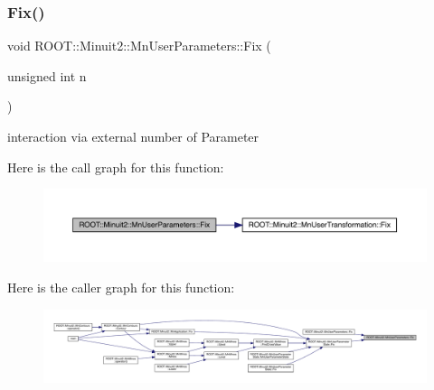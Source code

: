 \mbox{\label{classROOT_1_1Minuit2_1_1MnUserParameters_a53ce277313d9e1f8503e7ffbf8e7bce4}} 
\subsubsection{\texorpdfstring{Fix()}{Fix()}\hspace{0.1cm}{\footnotesize\ttfamily [1/4]}}
{\footnotesize\ttfamily void R\+O\+O\+T\+::\+Minuit2\+::\+Mn\+User\+Parameters\+::\+Fix (\begin{DoxyParamCaption}\item[{unsigned int}]{n }\end{DoxyParamCaption})}



interaction via external number of Parameter 

Here is the call graph for this function\+:\nopagebreak
\begin{figure}[H]
\begin{center}
\leavevmode
\includegraphics[width=350pt]{d6/d10/classROOT_1_1Minuit2_1_1MnUserParameters_a53ce277313d9e1f8503e7ffbf8e7bce4_cgraph}
\end{center}
\end{figure}
Here is the caller graph for this function\+:\nopagebreak
\begin{figure}[H]
\begin{center}
\leavevmode
\includegraphics[width=350pt]{d6/d10/classROOT_1_1Minuit2_1_1MnUserParameters_a53ce277313d9e1f8503e7ffbf8e7bce4_icgraph}
\end{center}
\end{figure}
\mbox{\label{classROOT_1_1Minuit2_1_1MnUserParameters_a53ce277313d9e1f8503e7ffbf8e7bce4}} 
